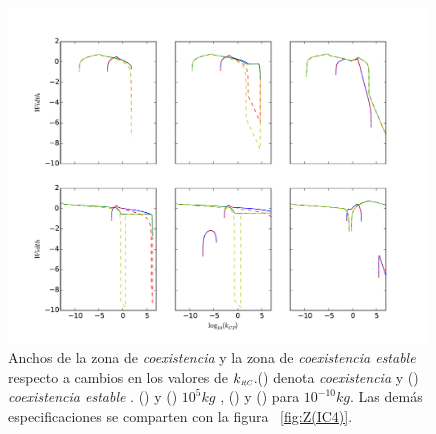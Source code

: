 \begin{figure}
  \centering
  \includegraphics[width = 0.99\textwidth]{./Plots/WidthCoexistenceAcGrGr.pdf}
  \caption[Ancho $Coexistencia$]{Anchos de la zona de \emph{coexistencia} y la zona de \emph{coexistencia estable} respecto a cambios en los valores de $k_{\textit{\tiny RC}}$.({\hwplotT}) denota \emph{coexistencia} y ({\hwplotK}) \emph{coexistencia estable} . ({\hwplotG}) y  ({\hwplotY}) $10^5 kg$ , ({\hwplotR}) y ({\hwplotB}) para $10^{-10}kg$. Las dem\'as especificaciones se comparten con la figura ~\ref{fig:Z(IC4)}.}
  \label{fig:CoexistenceWidth}
\end{figure}
























